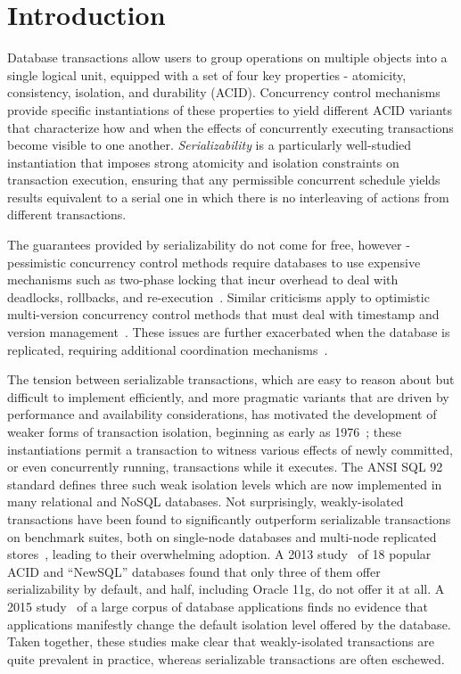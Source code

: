 
\section{Introduction}

Database transactions allow users to group operations on multiple
objects into a single logical unit, equipped with a set of four key
properties - atomicity, consistency, isolation, and durability (ACID).
Concurrency control mechanisms provide specific instantiations of
these properties to yield different ACID variants that characterize
how and when the effects of concurrently executing transactions become
visible to one another.  \emph{Serializability} is a particularly
well-studied instantiation that imposes strong atomicity and isolation
constraints on transaction execution, ensuring that any permissible
concurrent schedule yields results equivalent to a serial one in which
there is no interleaving of actions from different transactions.

The guarantees provided by serializability do not come for free,
however - pessimistic concurrency control methods require databases to
use expensive mechanisms such as two-phase locking that incur overhead
to deal with deadlocks, rollbacks, and
re-execution~\cite{twopl,ullmanbook}.  Similar criticisms apply to
optimistic multi-version concurrency control methods that must deal
with timestamp and version management~\cite{BG81}.  These issues are
further exacerbated when the database is replicated, requiring
additional coordination
mechanisms~\cite{cap,sernotavlbl,bailishat,bernsigmod13}.

The tension between serializable transactions, which are easy to
reason about but difficult to implement efficiently, and more
pragmatic variants that are driven by performance and availability
considerations, has motivated the development of weaker forms of
transaction isolation, beginning as early as 1976~\cite{gray1976};
these instantiations permit a transaction to witness various effects
of newly committed, or even concurrently running, transactions while
it executes.  The ANSI SQL 92 standard defines three such weak
isolation levels which are now implemented in many relational and
NoSQL databases. Not surprisingly, weakly-isolated transactions have
been found to significantly outperform serializable transactions on
benchmark suites, both on single-node databases and multi-node
replicated stores~\cite{dbtuningbook,bailishat,bailisvldb}, leading to
their overwhelming adoption. A 2013 study~\cite{bailishotos} of 18
popular ACID and ``NewSQL'' databases found that only three of them
offer serializability by default, and half, including Oracle 11g, do
not offer it at all.  A 2015 study~\cite{bailisferal} of a large
corpus of database applications finds no evidence that applications
manifestly change the default isolation level offered by the
database. Taken together, these studies make clear that
weakly-isolated transactions are quite prevalent in practice, whereas
serializable transactions are often eschewed.

